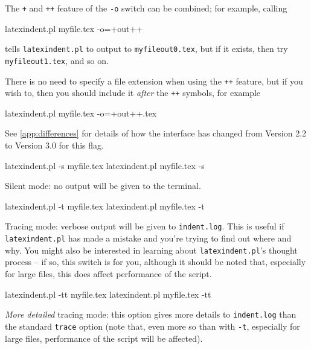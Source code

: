 	The \texttt{+} and \texttt{++} feature of the \texttt{-o} switch can be combined; for
	example, calling
	\begin{commandshell}
latexindent.pl myfile.tex -o=+out++
\end{commandshell}
	tells \texttt{latexindent.pl} to output to \texttt{myfileout0.tex}, but if it exists,
	then try \texttt{myfileout1.tex}, and so on.

	There is no need to specify a file extension when using the \texttt{++} feature, but if
	you wish to, then you should include it \emph{after} the \texttt{++} symbols, for example
	\begin{commandshell}
latexindent.pl myfile.tex -o=+out++.tex
\end{commandshell}

	See \vref{app:differences} for details of how the interface has changed from Version 2.2
	to Version 3.0 for this flag.
	\begin{commandshell}
latexindent.pl -s myfile.tex
latexindent.pl myfile.tex -s
\end{commandshell}

	Silent mode: no output will be given to the terminal.

	\begin{commandshell}
latexindent.pl -t myfile.tex
latexindent.pl myfile.tex -t
\end{commandshell}

	\label{page:traceswitch}
	Tracing mode: verbose output will be given to \texttt{indent.log}. This is useful if
	\texttt{latexindent.pl} has made a mistake and you're trying to find out where and why.
	You might also be interested in learning about \texttt{latexindent.pl}'s thought process
	-- if so, this switch is for you, although it should be noted that, especially for large
	files, this does affect performance of the script.

	\begin{commandshell}
latexindent.pl -tt myfile.tex
latexindent.pl myfile.tex -tt
\end{commandshell}

	\emph{More detailed} tracing mode: this option gives more details to
	\texttt{indent.log}
	than the standard \texttt{trace} option (note that, even more so than with \texttt{-t},
	especially for large files, performance of the script will be affected).

